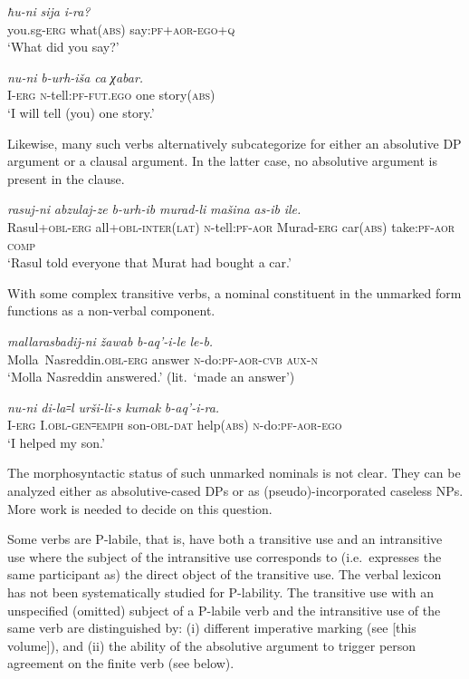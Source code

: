 ﻿\documentclass[output=paper]{langsci/langscibook}
\begin{document}
\ea %
\gll \emph{ħu-ni} \emph{sija} \emph{i-ra?}\\
you.sg-\textsc{erg} what(\textsc{abs}) say:\textsc{pf}+\textsc{aor}-\textsc{ego}+\textsc{q}\\
\glt `What did you say?'

\ex %
\gll \emph{nu-ni} \emph{b-urh-iša} \emph{ca} \emph{χabar.}\\
I-\textsc{erg} \textsc{n}-tell:\textsc{pf}-\textsc{fut}.\textsc{ego} one story(\textsc{abs})\\
\glt `I will tell (you) one story.'
\z

Likewise, many such verbs alternatively subcategorize for either an
absolutive DP argument or a clausal argument. In the latter case, 
no absolutive argument is present in the clause.

\ea %
\gll \emph{rasuj-ni} \emph{abzulaj-ze} \emph{b-urh-ib} \emph{murad-li} \emph{mašina} \emph{as-ib} \emph{ile.}\\
Rasul+\textsc{obl}-\textsc{erg} all+\textsc{obl}-\textsc{inter(lat)} \textsc{n}-tell:\textsc{pf}-\textsc{aor} Murad-\textsc{erg} car(\textsc{abs}) take:\textsc{pf}-\textsc{aor} \textsc{comp}\\
\glt `Rasul told everyone that Murat had bought a car.'
\z

With some complex transitive verbs, a nominal constituent in the
unmarked form functions as a non-verbal component.

\ea %
\gll \emph{mallarasbadij-ni} \emph{žawab} \emph{b-aq'-i-le} \emph{le-b.}\\
Molla~Nasreddin.\textsc{obl}-\textsc{erg} answer \textsc{n}-do:\textsc{pf}-\textsc{aor}-\textsc{cvb} \textsc{aux}-\textsc{n}\\
\glt `Molla Nasreddin answered.' (lit.\ `made an answer')

\ex %
\gll \emph{nu-ni} \emph{di-la꞊l} \emph{urši-li-s} \emph{kumak} \emph{b-aq'-i-ra.}\\
I-\textsc{erg} I.\textsc{obl}-\textsc{gen}꞊\textsc{emph} son-\textsc{obl}-\textsc{dat} help(\textsc{abs}) \textsc{n}-do:\textsc{pf}-\textsc{aor}-\textsc{ego}\\
\glt `I helped my son.'
\z

The morphosyntactic status of such unmarked nominals is not clear. They
can be analyzed either as absolutive-cased DPs or as
(pseudo)-incorporated caseless NPs. More work is needed to decide on
this question.

Some verbs are P-labile, that is, have both a transitive use and an
intransitive use where the subject of the intransitive use corresponds to
(i.e.\ expresses the same participant as) the direct object of the
transitive use. The verbal lexicon has not been systematically studied
for P-lability. The transitive use with an unspecified (omitted) subject
of a P-labile verb and the intransitive use of the same verb are
distinguished by: (i) different imperative marking (see \citealt{daniel2019} [this
volume]), and (ii) the ability of the absolutive argument to trigger
person agreement on the finite verb (see  below).
\end{document}
